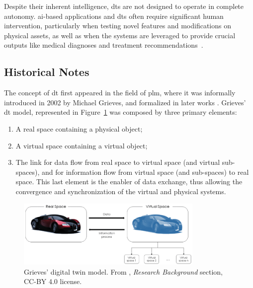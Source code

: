 Despite their inherent intelligence, \acrshort{dt}s are not designed to operate in complete autonomy. \acrshort{ai}-based applications and \acrshort{dt}s often require significant human intervention, particularly when testing novel features and modifications on physical assets, as well as when the systems are leveraged to provide crucial outputs like medical diagnoses and treatment recommendations~\parencite{barricelliSurveyDigitalTwin2019}.

\subsection{Historical Notes}

The concept of \acrshort{dt} first appeared in the field of \acrfull{plm}, where it was informally introduced in 2002 by Michael Grieves, and formalized in later works \parencite{grievesDigitalTwinManufacturing2015,grievesDigitalTwinMitigating2017}. Grieves' \acrshort{dt} model, represented in Figure~\ref{fig:grieves_digital_twin} was composed by three primary elements:
\begin{enumerate}
    \item A real space containing a physical object;
    \item A virtual space containing a virtual object;
    \item The link for data flow from real space to virtual space (and virtual sub-spaces), and for information flow from virtual space (and sub-spaces) to real space. This last element is the enabler of data exchange, thus allowing the convergence and synchronization of the virtual and physical systems.
\end{enumerate}

\begin{figure}
    \centering
    \includegraphics[width=0.8\textwidth]{images/dt_model_grieves.png}
    \caption[Grieves' digital twin model]{Grieves' digital twin model. From \cite{barricelliSurveyDigitalTwin2019}, \textit{Research Background} section, CC-BY 4.0 license.}
    \label{fig:grieves_digital_twin}
\end{figure}

